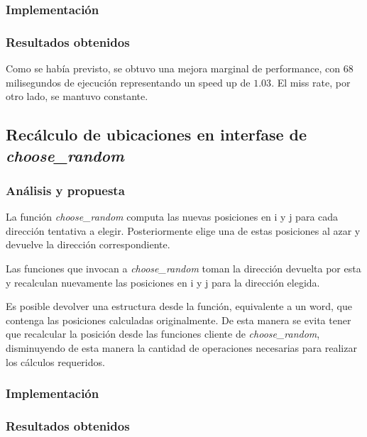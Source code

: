 \documentclass[a4paper,11pt]{article}
\begin{document}
\subsubsection{Implementación}



\subsubsection{Resultados obtenidos}

Como se había previsto, se obtuvo una mejora marginal de performance, con 68
milisegundos de ejecución representando un speed up de \(1.03\). El miss rate,
por otro lado, se mantuvo constante.

\subsection{Recálculo de ubicaciones en interfase de \textit{choose\_random}}

\subsubsection{Análisis y propuesta}

La función \textit{choose\_random} computa las nuevas posiciones en i y j para
cada dirección tentativa a elegir. Posteriormente elige una de estas posiciones
al azar y devuelve la dirección correspondiente.

Las funciones que invocan a \textit{choose\_random} toman la dirección devuelta
por esta y recalculan nuevamente las posiciones en i y j para la dirección
elegida.

Es posible devolver una estructura desde la función, equivalente a un word, que
contenga las posiciones calculadas originalmente. De esta manera se evita tener
que recalcular la posición desde las funciones cliente de
\textit{choose\_random}, disminuyendo de esta manera la cantidad de operaciones
necesarias para realizar los cálculos requeridos.

\subsubsection{Implementación}



\subsubsection{Resultados obtenidos}
\end{document}
